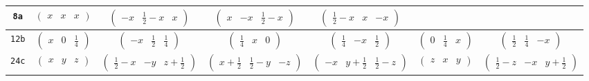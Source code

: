 \documentclass[fleqn,9pt,landscape]{jsarticle}
\begin{document}
\begin{center}
\begin{longtable}{ccccccc}
{\tt 8a} & $ \begin{pmatrix} x & x & x \end{pmatrix} $ & $ \begin{pmatrix} - x & \frac{1}{2} - x & x \end{pmatrix} $ & $ \begin{pmatrix} x & - x & \frac{1}{2} - x \end{pmatrix} $ & $ \begin{pmatrix} \frac{1}{2} - x & x & - x \end{pmatrix} $ & $  $ & $  $ \\ \hline
{\tt 12b} & $ \begin{pmatrix} x & 0 & \frac{1}{4} \end{pmatrix} $ & $ \begin{pmatrix} - x & \frac{1}{2} & \frac{1}{4} \end{pmatrix} $ & $ \begin{pmatrix} \frac{1}{4} & x & 0 \end{pmatrix} $ & $ \begin{pmatrix} \frac{1}{4} & - x & \frac{1}{2} \end{pmatrix} $ & $ \begin{pmatrix} 0 & \frac{1}{4} & x \end{pmatrix} $ & $ \begin{pmatrix} \frac{1}{2} & \frac{1}{4} & - x \end{pmatrix} $ \\ \hline
{\tt 24c} & $ \begin{pmatrix} x & y & z \end{pmatrix} $ & $ \begin{pmatrix} \frac{1}{2} - x & - y & z + \frac{1}{2} \end{pmatrix} $ & $ \begin{pmatrix} x + \frac{1}{2} & \frac{1}{2} - y & - z \end{pmatrix} $ & $ \begin{pmatrix} - x & y + \frac{1}{2} & \frac{1}{2} - z \end{pmatrix} $ & $ \begin{pmatrix} z & x & y \end{pmatrix} $ & $ \begin{pmatrix} \frac{1}{2} - z & - x & y + \frac{1}{2} \end{pmatrix} $ \\

\end{longtable}
\end{center}
\end{document}
